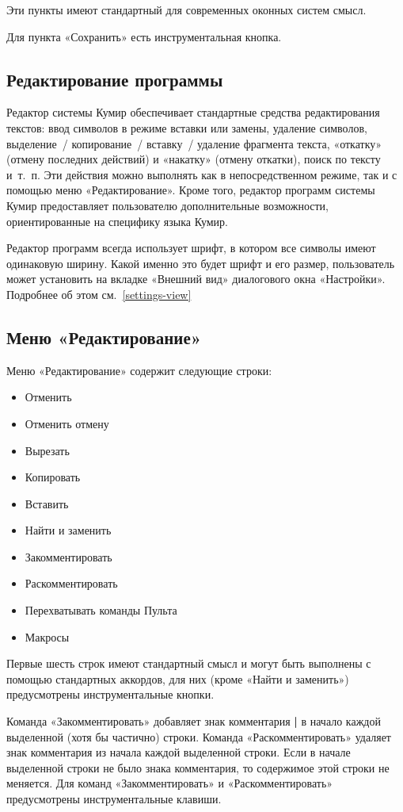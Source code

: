 \documentclass[12pt,a4paper]{article}
\begin{document}
Эти пункты имеют стандартный для современных оконных систем смысл.

Для пункта «Сохранить» есть инструментальная кнопка.

\subsection{Редактирование программы}

Редактор системы Кумир обеспечивает стандартные средства редактирования текстов: ввод символов в режиме вставки или замены, удаление символов, выделение~/ копирование~/ вставку~/ удаление фрагмента текста, «откатку» (отмену последних действий) и «накатку» (отмену откатки), поиск по тексту и~т.~п. Эти действия можно выполнять как в непосредственном режиме, так и с помощью меню «Редактирование». Кроме того, редактор программ системы Кумир предоставляет пользователю дополнительные возможности, ориентированные на специфику языка Кумир.

Редактор программ всегда использует шрифт, в котором все символы имеют одинаковую ширину. Какой именно это будет шрифт и его размер, пользователь может установить на вкладке «Внешний вид» диалогового окна «Настройки». Подробнее об этом см.~\ref{settings-view} 

\subsection{Меню «Редактирование»}

Меню «Редактирование» содержит следующие строки:
\begin{itemize}
\item		Отменить
\item		Отменить отмену
\item		Вырезать
\item		Копировать
\item		Вставить
\item		Найти и заменить
\item		Закомментировать
\item		Раскомментировать
\item		Перехватывать команды Пульта
\item		Макросы
\end{itemize}

Первые шесть строк имеют стандартный смысл и могут быть выполнены с помощью стандартных аккордов, для них (кроме «Найти и заменить») предусмотрены инструментальные кнопки.

Команда «Закомментировать» добавляет знак комментария \textbf{\textsf{|}} в начало каждой выделенной (хотя бы частично) строки. Команда «Раскомментировать» удаляет знак комментария из начала каждой выделенной строки. Если в начале выделенной строки не было знака комментария, то содержимое этой строки не меняется. Для команд «Закомментировать» и «Раскомментировать» предусмотрены инструментальные клавиши.
\end{document}

